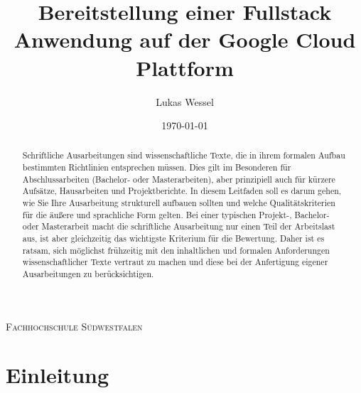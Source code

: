 \documentclass[pdftex,a4paper,abstracton,11pt,parskip=half,bibtotocnumbered]{scrartcl}
\title{Bereitstellung einer Fullstack Anwendung auf der Google Cloud Plattform}
\author{Lukas Wessel}
\date{\today}
\begin{document}
\makeatletter
\begin{titlepage}
	\centering
	{\scshape\LARGE Fachhochschule Südwestfalen \par}
	\vspace{1cm}
	\vspace{1.5cm}
	{\huge\bfseries \@title\par}
	\vspace{3cm}
	{\Large \@author\par}
	\vspace{1cm}
	{\Large \@date\par}
	\vfill

	\raggedright
\end{titlepage}
\makeatother

\thispagestyle{empty}
\begin{abstract}
Schriftliche Ausarbeitungen sind  wissenschaftliche Texte, die in ihrem formalen Aufbau bestimmten Richtlinien entsprechen müssen.
Dies gilt im Besonderen für Abschlussarbeiten (Bachelor- oder Masterarbeiten), aber prinzipiell auch für kürzere Aufsätze, Hausarbeiten und Projektberichte.
In diesem Leitfaden soll es darum gehen, wie Sie Ihre Ausarbeitung strukturell aufbauen sollten und welche Qualitätskriterien für die äußere und sprachliche Form gelten.
Bei einer typischen Projekt-, Bachelor- oder Masterarbeit macht die schriftliche Ausarbeitung nur einen Teil der Arbeitslast aus, ist aber gleichzeitig das wichtigste Kriterium für die Bewertung.
Daher ist es ratsam, sich möglichst frühzeitig mit den inhaltlichen und formalen Anforderungen wissenschaftlicher Texte vertraut zu machen und diese bei der Anfertigung eigener Ausarbeitungen zu berücksichtigen.
\end{abstract}

\vfill
\tableofcontents
\pagebreak

\setcounter{page}{1}

\Glossar

\section{Einleitung}
\end{document}
